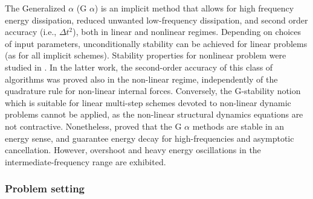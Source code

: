 The Generalized \textminus{} $\alpha$ (G \textminus{} $\alpha$)
is an implicit method that allows for high frequency energy dissipation,
reduced unwanted low-frequency dissipation, and second order accuracy
(i.e., $\Delta t^{2}$), both in linear and nonlinear regimes. Depending
on choices of input parameters, unconditionally stability can be achieved
for linear problems (as for all implicit schemes). Stability properties
for nonlinear problem were studied in \cite{erlicher2002analysis}. In
the latter work, the second-order accuracy of this class of algorithms
was proved also in the non-linear regime, independently of the quadrature
rule for non-linear internal forces. Conversely, the G-stability notion
which is suitable for linear multi-step schemes devoted to non-linear
dynamic problems cannot be applied, as the non-linear structural dynamics
equations are not contractive. Nonetheless, \cite{erlicher2002analysis}
proved that the G \textminus{} $\alpha$ methods are stable in an
energy sense, and guarantee energy decay for high-frequencies and
asymptotic cancellation. However, overshoot and heavy energy oscillations
in the intermediate-frequency range are exhibited.

\subsubsection{Problem setting}

